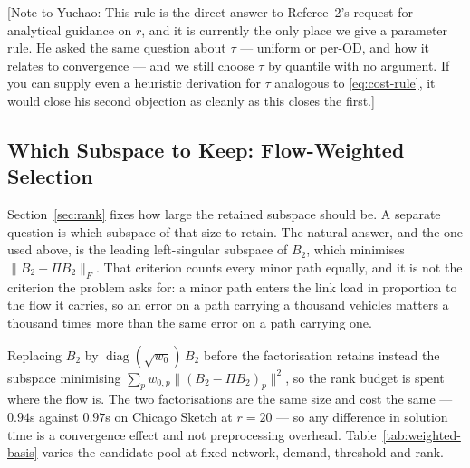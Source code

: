 \documentclass[11pt]{article}
\newif\ifshownotes \shownotestrue
\newcommand{\conoteY}[1]{\ifshownotes{\color{red}\small\textsf{[Note to Yuchao: #1]}}\fi}
\begin{document}
\conoteY{This rule is the direct answer to Referee~2's request for analytical guidance on
$r$, and it is currently the only place we give a parameter rule. He asked the same question
about $\tau$ --- uniform or per-OD, and how it relates to convergence --- and we still choose
$\tau$ by quantile with no argument. If you can supply even a heuristic derivation for $\tau$
analogous to \eqref{eq:cost-rule}, it would close his second objection as cleanly as this
closes the first.}


\subsection{Which Subspace to Keep: Flow-Weighted Selection}
\label{sec:weighted-basis}

Section~\ref{sec:rank} fixes how large the retained subspace should be. A separate question is
which subspace of that size to retain. The natural answer, and the one used above, is the
leading left-singular subspace of $B_2$, which minimises $\|B_2 - \Pi B_2\|_F$. That criterion
counts every minor path equally, and it is not the criterion the problem asks for: a minor path
enters the link load in proportion to the flow it carries, so an error on a path carrying a
thousand vehicles matters a thousand times more than the same error on a path carrying one.

Replacing $B_2$ by $\operatorname{diag}(\sqrt{w_0})\,B_2$ before the factorisation retains
instead the subspace minimising $\sum_p w_{0,p}\|(B_2-\Pi B_2)_p\|^2$, so the rank budget is
spent where the flow is. The two factorisations are the same size and cost the same --- $0.94$s
against $0.97$s on Chicago Sketch at $r=20$ --- so any difference in solution time is a
convergence effect and not preprocessing overhead. Table~\ref{tab:weighted-basis} varies the
candidate pool at fixed network, demand, threshold and rank.
\end{document}
